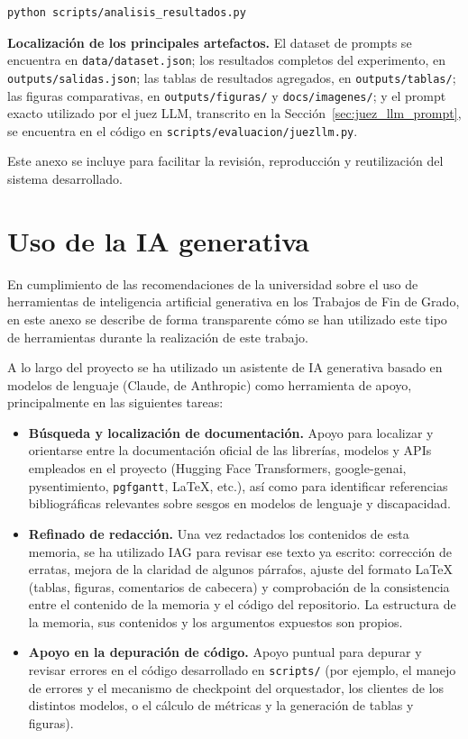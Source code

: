\documentclass[12pt]{report} %
\renewcommand{\_}{\oldunderscore\allowbreak}
\begin{document}
\begin{verbatim}
python scripts/analisis_resultados.py
\end{verbatim}

\textbf{Localización de los principales artefactos.} El dataset de prompts se encuentra en \texttt{data/dataset.json}; los resultados completos del experimento, en \texttt{outputs/salidas.json}; las tablas de resultados agregados, en \texttt{outputs/tablas/}; las figuras comparativas, en \texttt{outputs/figuras/} y \texttt{docs/imagenes/}; y el prompt exacto utilizado por el juez LLM, transcrito en la Sección~\ref{sec:juez_llm_prompt}, se encuentra en el código en \texttt{scripts/evaluacion/juez\_llm.py}.

Este anexo se incluye para facilitar la revisión, reproducción y reutilización del sistema desarrollado.

\chapter{Uso de la IA generativa}

En cumplimiento de las recomendaciones de la universidad sobre el uso de herramientas de inteligencia artificial generativa en los Trabajos de Fin de Grado, en este anexo se describe de forma transparente cómo se han utilizado este tipo de herramientas durante la realización de este trabajo.

A lo largo del proyecto se ha utilizado un asistente de IA generativa basado en modelos de lenguaje (Claude, de Anthropic) como herramienta de apoyo, principalmente en las siguientes tareas:

\begin{itemize}
    \item \textbf{Búsqueda y localización de documentación.} Apoyo para localizar y orientarse entre la documentación oficial de las librerías, modelos y APIs empleados en el proyecto (Hugging Face Transformers, google-genai, pysentimiento, \texttt{pgfgantt}, \LaTeX{}, etc.), así como para identificar referencias bibliográficas relevantes sobre sesgos en modelos de lenguaje y discapacidad.

    \item \textbf{Refinado de redacción.} Una vez redactados los contenidos de esta memoria, se ha utilizado IAG para revisar ese texto ya escrito: corrección de erratas, mejora de la claridad de algunos párrafos, ajuste del formato \LaTeX{} (tablas, figuras, comentarios de cabecera) y comprobación de la consistencia entre el contenido de la memoria y el código del repositorio. La estructura de la memoria, sus contenidos y los argumentos expuestos son propios.

    \item \textbf{Apoyo en la depuración de código.} Apoyo puntual para depurar y revisar errores en el código desarrollado en \texttt{scripts/} (por ejemplo, el manejo de errores y el mecanismo de checkpoint del orquestador, los clientes de los distintos modelos, o el cálculo de métricas y la generación de tablas y figuras).
\end{itemize}
\end{document}

